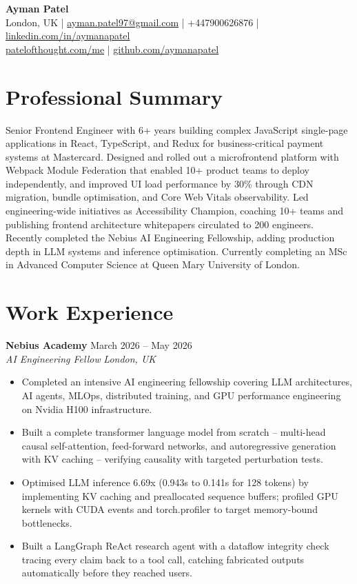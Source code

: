 \documentclass[a4paper,10pt]{article}
\newcommand{\role}[4]{
  \textbf{\color{accent}#1} \hfill {\small #2}\\
  \textit{#3} \hfill {\small \textit{#4}}
}
\begin{document}
\begin{center}
  {\LARGE \textbf{Ayman Patel}}\\
  \vspace{2pt}
  London, UK \quad | \quad
  \href{mailto:ayman.patel97@gmail.com}{ayman.patel97@gmail.com} \quad | \quad
  +447900626876 \quad | \quad
  \href{https://linkedin.com/in/aymanapatel}{linkedin.com/in/aymanapatel}\\
  \href{https://patelofthought.com/me}{patelofthought.com/me} \quad | \quad
  \href{https://github.com/aymanapatel}{github.com/aymanapatel}
\end{center}

\section{Professional Summary}
{\small
Senior Frontend Engineer with 6+ years building complex JavaScript single-page applications in React, TypeScript, and Redux for business-critical payment systems at Mastercard. Designed and rolled out a microfrontend platform with Webpack Module Federation that enabled 10+ product teams to deploy independently, and improved UI load performance by 30\% through CDN migration, bundle optimisation, and Core Web Vitals observability. Led engineering-wide initiatives as Accessibility Champion, coaching 10+ teams and publishing frontend architecture whitepapers circulated to 200 engineers. Recently completed the Nebius AI Engineering Fellowship, adding production depth in LLM systems and inference optimisation. Currently completing an MSc in Advanced Computer Science at Queen Mary University of London.
}

\section{Work Experience}
\role{Nebius Academy}{March 2026 -- May 2026}{AI Engineering Fellow}{London, UK}
\begin{itemize}
  \item Completed an intensive AI engineering fellowship covering LLM architectures, AI agents, MLOps, distributed training, and GPU performance engineering on Nvidia H100 infrastructure.
  \item Built a complete transformer language model from scratch -- multi-head causal self-attention, feed-forward networks, and autoregressive generation with KV caching -- verifying causality with targeted perturbation tests.
  \item Optimised LLM inference 6.69x (0.943s to 0.141s for 128 tokens) by implementing KV caching and preallocated sequence buffers; profiled GPU kernels with CUDA events and torch.profiler to target memory-bound bottlenecks.
  \item Built a LangGraph ReAct research agent with a dataflow integrity check tracing every claim back to a tool call, catching fabricated outputs automatically before they reached users.
\end{itemize}
\end{document}
